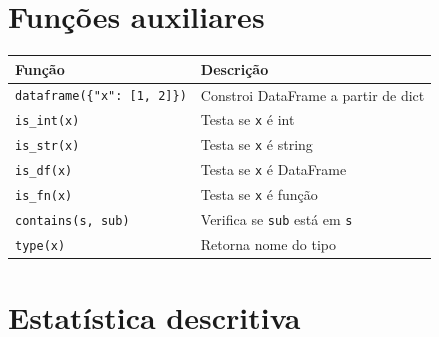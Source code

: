 \section{Funções auxiliares}

\begin{center}
\begin{tabular}{ll}
\toprule
\textbf{Função} & \textbf{Descrição} \\
\midrule
\texttt{dataframe(\{"x": [1, 2]\})} & Constroi DataFrame a partir de dict \\
\texttt{is\_int(x)}  & Testa se \texttt{x} é int \\
\texttt{is\_str(x)}  & Testa se \texttt{x} é string \\
\texttt{is\_df(x)}   & Testa se \texttt{x} é DataFrame \\
\texttt{is\_fn(x)}   & Testa se \texttt{x} é função \\
\texttt{contains(s, sub)} & Verifica se \texttt{sub} está em \texttt{s} \\
\texttt{type(x)}      & Retorna nome do tipo \\
\bottomrule
\end{tabular}
\end{center}

\section{Estatística descritiva}

